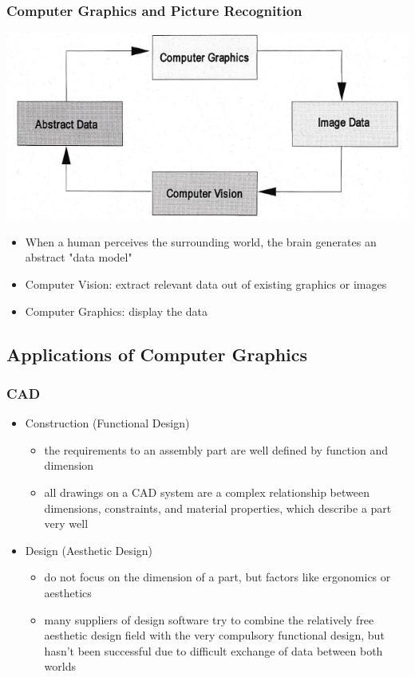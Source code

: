 \documentclass[12pt]{article}
\begin{document}
\subsubsection*{Computer Graphics and Picture Recognition}

\includegraphics[scale=0.6]{3_1}

\begin{itemize}
	\item When a human perceives the surrounding world, the brain generates an abstract "data model"
	\item Computer Vision: extract relevant data out of existing graphics or images
	\item Computer Graphics: display the data
\end{itemize}

\subsection{Applications of Computer Graphics}

\subsubsection*{CAD}

\begin{itemize}
	\item Construction (Functional Design)
	\begin{itemize}
		\item the requirements to an assembly part are well defined by function and dimension
		\item all drawings on a CAD system are a complex relationship between dimensions, constraints, and material properties, which describe a part very well
	\end{itemize}
	\item Design (Aesthetic Design)
	\begin{itemize}
		\item do not focus on the dimension of a part, but factors like ergonomics or aesthetics
		\item many suppliers of design software try to combine the relatively free aesthetic design field with the very compulsory functional design, but hasn't been successful due to difficult exchange of data between both worlds
	\end{itemize}
\end{itemize}
\end{document}
